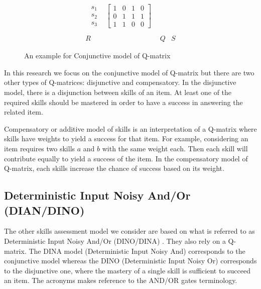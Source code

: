 \begin{figure}
\begin{footnotesize}
\[\begin{array}{ccc}
\begin{array}{cc}
\begin{array}{c}
s_{1}\\
s_{2}\\
s_{3}
\end{array} & \left[\begin{array}{cccc}
1 & 0 & 1 & 0\\
0 & 1 & 1 & 1\\
1 & 1 & 0 & 0
\end{array}\right]
\end{array}\\
\\
R & Q & S
\end{array}
\]
 \end{footnotesize} \caption{An example for Conjunctive model of Q-matrix}


\label{fig1} 
\end{figure}


In this research we focus on the conjunctive model of Q-matrix but there are two other types of Q-matrices: disjunctive and compensatory. In the disjunctive model, there is a disjunction between skills of an item. At least one of the required skills should be mastered in order to have a success in answering the related item.

Compensatory or additive model of skills is an interpretation of a Q-matrix where skills have weights to yield a success for that item. For example, considering an item requires two skills $a$ and $b$ with the same weight each. Then each skill will contribute equally to yield a success of the item. In the compensatory model of Q-matrix, each skills increase the chance of success based on its weight.

\subsection{Deterministic Input Noisy And/Or (DIAN/DINO)}

\DIFdelbegin %

\DIFdelend The other skills assessment model we consider are based on what is referred to as Deterministic Input Noisy And/Or (DINO/DINA) \cite{junker2001cognitive}.  They also rely on a Q-matrix. The DINA model (Deterministic Input Noisy And) corresponds to the conjunctive model whereas the DINO (Deterministic Input Noisy Or) corresponds to the disjunctive one, where the mastery of a single skill is sufficient to succeed an item.  The acronyms makes reference to the AND/OR gates terminology.

